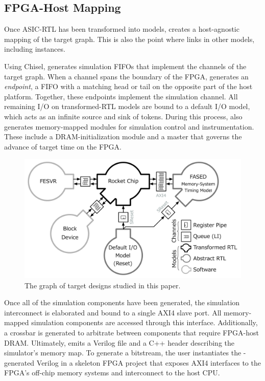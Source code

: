\subsection{FPGA-Host Mapping}

Once ASIC-RTL has been transformed into models, \SIMNAME creates a host-agnostic
mapping of the target graph. This is also the point where \SIMNAME links in
other models, including \PNAME instances.

Using Chisel, \SIMNAME generates simulation FIFOs that implement the channels of
the target graph.  When a channel spans the boundary of the FPGA, \SIMNAME
generates an \emph{endpoint}, a FIFO with a matching head or tail on the
opposite part of the host platform.  Together, these endpoints implement the
simulation channel.  All remaining I/O on transformed-RTL models
are bound to a default I/O model, which acts as an infinite source and sink of
tokens.  During this process, \SIMNAME also generates memory-mapped modules for
simulation control and instrumentation. These include a DRAM-initialization
module and a master that governs the advance of target time on the FPGA.

\begin{figure}[t]
\vspace{-0.1in}
    \centering
    \includegraphics[width=\columnwidth]{figures/target-graph.pdf}
    \vspace{-0.10in}
    \caption{The graph of target designs studied in this paper.}
    \label{fig:default-target}
    \vspace{-0.15in}
\end{figure}

Once all of the simulation components have been generated, the simulation
interconnect is elaborated and bound to a single AXI4 slave port. All
memory-mapped simulation components are accessed through this
interface. Additionally, a crossbar is generated to arbitrate between components
that require FPGA-host DRAM. Ultimately, \SIMNAME emits a Verilog file and a
C++ header describing the simulator's memory map. To generate a bitstream, the
user instantiates the \SIMNAME-generated Verilog in a skeleton FPGA project
that exposes AXI4 interfaces to the FPGA's off-chip memory systems and
interconnect to the host CPU.

